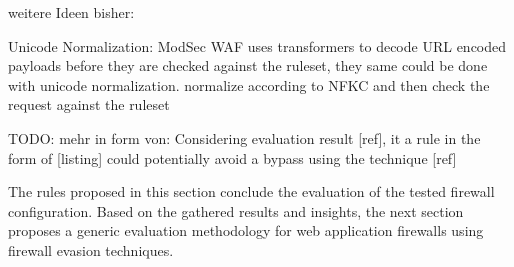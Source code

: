 {\color{red}weitere Ideen bisher:}

Unicode Normalization: ModSec WAF uses transformers to decode URL encoded payloads before they are checked against the ruleset, they same could be done with unicode normalization. normalize according to NFKC and then check the request against the ruleset



{\color{red} TODO: mehr in form von: Considering evaluation result [ref], it a rule in the form of [listing] could potentially avoid a bypass using the technique [ref]}

The rules proposed in this section conclude the evaluation of the tested firewall configuration. Based on the gathered results and insights, the next section proposes a generic evaluation methodology for web application firewalls using firewall evasion techniques.

